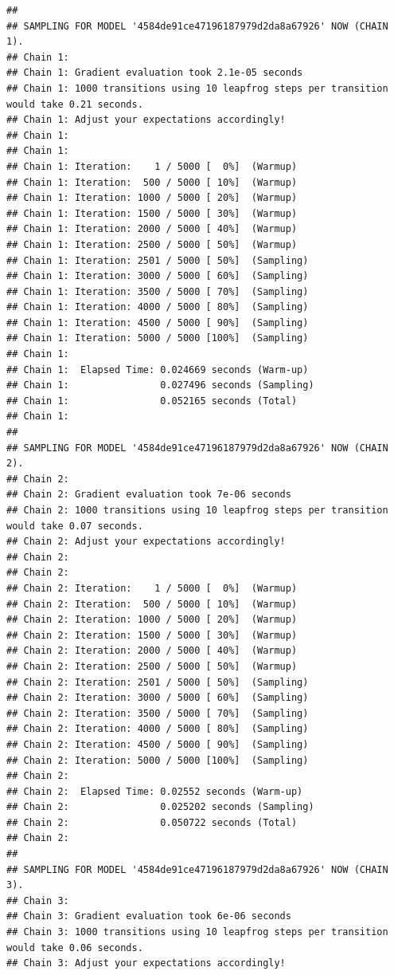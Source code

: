 \documentclass[
  12pt,
]{book}
\theoremstyle{definition}
\theoremstyle{definition}
\theoremstyle{definition}
\theoremstyle{definition}
\theoremstyle{remark}
\begin{document}
\begin{verbatim}
## 
## SAMPLING FOR MODEL '4584de91ce47196187979d2da8a67926' NOW (CHAIN 1).
## Chain 1: 
## Chain 1: Gradient evaluation took 2.1e-05 seconds
## Chain 1: 1000 transitions using 10 leapfrog steps per transition would take 0.21 seconds.
## Chain 1: Adjust your expectations accordingly!
## Chain 1: 
## Chain 1: 
## Chain 1: Iteration:    1 / 5000 [  0%]  (Warmup)
## Chain 1: Iteration:  500 / 5000 [ 10%]  (Warmup)
## Chain 1: Iteration: 1000 / 5000 [ 20%]  (Warmup)
## Chain 1: Iteration: 1500 / 5000 [ 30%]  (Warmup)
## Chain 1: Iteration: 2000 / 5000 [ 40%]  (Warmup)
## Chain 1: Iteration: 2500 / 5000 [ 50%]  (Warmup)
## Chain 1: Iteration: 2501 / 5000 [ 50%]  (Sampling)
## Chain 1: Iteration: 3000 / 5000 [ 60%]  (Sampling)
## Chain 1: Iteration: 3500 / 5000 [ 70%]  (Sampling)
## Chain 1: Iteration: 4000 / 5000 [ 80%]  (Sampling)
## Chain 1: Iteration: 4500 / 5000 [ 90%]  (Sampling)
## Chain 1: Iteration: 5000 / 5000 [100%]  (Sampling)
## Chain 1: 
## Chain 1:  Elapsed Time: 0.024669 seconds (Warm-up)
## Chain 1:                0.027496 seconds (Sampling)
## Chain 1:                0.052165 seconds (Total)
## Chain 1: 
## 
## SAMPLING FOR MODEL '4584de91ce47196187979d2da8a67926' NOW (CHAIN 2).
## Chain 2: 
## Chain 2: Gradient evaluation took 7e-06 seconds
## Chain 2: 1000 transitions using 10 leapfrog steps per transition would take 0.07 seconds.
## Chain 2: Adjust your expectations accordingly!
## Chain 2: 
## Chain 2: 
## Chain 2: Iteration:    1 / 5000 [  0%]  (Warmup)
## Chain 2: Iteration:  500 / 5000 [ 10%]  (Warmup)
## Chain 2: Iteration: 1000 / 5000 [ 20%]  (Warmup)
## Chain 2: Iteration: 1500 / 5000 [ 30%]  (Warmup)
## Chain 2: Iteration: 2000 / 5000 [ 40%]  (Warmup)
## Chain 2: Iteration: 2500 / 5000 [ 50%]  (Warmup)
## Chain 2: Iteration: 2501 / 5000 [ 50%]  (Sampling)
## Chain 2: Iteration: 3000 / 5000 [ 60%]  (Sampling)
## Chain 2: Iteration: 3500 / 5000 [ 70%]  (Sampling)
## Chain 2: Iteration: 4000 / 5000 [ 80%]  (Sampling)
## Chain 2: Iteration: 4500 / 5000 [ 90%]  (Sampling)
## Chain 2: Iteration: 5000 / 5000 [100%]  (Sampling)
## Chain 2: 
## Chain 2:  Elapsed Time: 0.02552 seconds (Warm-up)
## Chain 2:                0.025202 seconds (Sampling)
## Chain 2:                0.050722 seconds (Total)
## Chain 2: 
## 
## SAMPLING FOR MODEL '4584de91ce47196187979d2da8a67926' NOW (CHAIN 3).
## Chain 3: 
## Chain 3: Gradient evaluation took 6e-06 seconds
## Chain 3: 1000 transitions using 10 leapfrog steps per transition would take 0.06 seconds.
## Chain 3: Adjust your expectations accordingly!

\end{verbatim}
\end{document}
